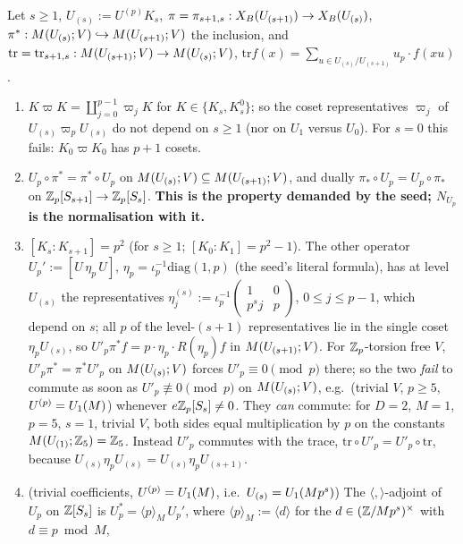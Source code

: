 \begin{lemma}[properties of $N_{U_p}$]\label{lem:s01-Up}
Let $s\ge1$, $U_{(s)}:=U^{(p)}K_s$, $\pi=\pi_{s+1,s}:X_B(U_{(s+1)})\to X_B(U_{(s)})$, $\pi^*:M(U_{(s)};V)\hookrightarrow M(U_{(s+1)};V)$
the inclusion, and $\mathrm{tr}=\mathrm{tr}_{s+1,s}:M(U_{(s+1)};V)\to M(U_{(s)};V)$,
$\mathrm{tr}f(x)=\sum_{u\in U_{(s)}/U_{(s+1)}}u_p\cdot f(xu)$.
\begin{enumerate}[label=(\alph*)]
\item $K\varpi K=\coprod_{j=0}^{p-1}\varpi_jK$ for $K\in\{K_s,K^0_s\}$; so the coset representatives $\varpi_j$ of $U_{(s)}\varpi_pU_{(s)}$ do
  not depend on $s\ge1$ (nor on $U_1$ versus $U_0$). For $s=0$ this fails: $K_0\varpi K_0$ has $p+1$ cosets.
\item $U_p\circ\pi^*=\pi^*\circ U_p$ on $M(U_{(s)};V)\subseteq M(U_{(s+1)};V)$, and dually $\pi_*\circ U_p=U_p\circ\pi_*$
  on $\mathbb{Z}_p[S_{s+1}]\to\mathbb{Z}_p[S_s]$. \textbf{This is the property demanded by the seed; $N_{U_p}$ is the normalisation with it.}
\item $[K_s:K_{s+1}]=p^2$ (for $s\ge1$; $[K_0:K_1]=p^2-1$). The other operator $U_p':=[U\,\eta_p\,U]$, $\eta_p=\iota_p^{-1}\mathrm{diag}(1,p)$
  (the seed's literal formula), has at level $U_{(s)}$ the representatives
  $\eta^{(s)}_j:=\iota_p^{-1}\left(\begin{smallmatrix}1&0\\p^sj&p\end{smallmatrix}\right)$, $0\le j\le p-1$, which depend on $s$; all $p$ of the
  level-$(s+1)$ representatives lie in the single coset $\eta_pU_{(s)}$, so $U'_p\pi^*f=p\cdot\eta_p\cdot R(\eta_p)f$ in
  $M(U_{(s+1)};V)$. For $\mathbb{Z}_p$-torsion free $V$, $U'_p\pi^*=\pi^*U'_p$ on $M(U_{(s)};V)$ forces
  $U'_p\equiv0\pmod p$ there; so the two \emph{fail} to commute as soon as $U'_p\not\equiv0\pmod p$ on $M(U_{(s)};V)$, e.g.\
  (trivial $V$, $p\ge5$, $U^{(p)}=U_1(M)$) whenever $e\mathbb{Z}_p[S_s]\ne0$. They \emph{can} commute: for $D=2$, $M=1$, $p=5$, $s=1$, trivial $V$, both sides
  equal multiplication by $p$ on the constants $M(U_{(1)};\mathbb{Z}_5)=\mathbb{Z}_5$. Instead $U'_p$
  commutes with the trace, $\mathrm{tr}\circ U'_p=U'_p\circ\mathrm{tr}$, because $U_{(s)}\eta_pU_{(s)}=U_{(s)}\eta_pU_{(s+1)}$.
\item (trivial coefficients, $U^{(p)}=U_1(M)$, i.e.\ $U_{(s)}=U_1(Mp^s)$) The $\langle,\rangle$-adjoint of $U_p$ on $\mathbb{Z}[S_s]$ is
  $U_p^*=\langle p\rangle_M\,U_p'$, where $\langle p\rangle_M:=\langle d\rangle$ for the $d\in(\mathbb{Z}/Mp^s)^\times$ with $d\equiv p\bmod M$,

\end{enumerate}
\end{lemma}
